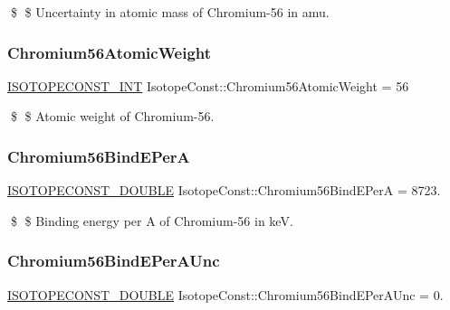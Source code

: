 \$ \$ Uncertainty in atomic mass of Chromium-\/56 in amu. \mbox{\label{group___isotope_const-_chromium-_cr56_gaf7f0bd3cfef314ac0103cbfc12ed80d1}} 
\subsubsection{\texorpdfstring{Chromium56\+Atomic\+Weight}{Chromium56AtomicWeight}}
{\footnotesize\ttfamily \mbox{\hyperlink{group___isotope_const-_macros_ga5f18360b3e99483a35c32d789e62621c}{I\+S\+O\+T\+O\+P\+E\+C\+O\+N\+S\+T\+\_\+\+I\+NT}} Isotope\+Const\+::\+Chromium56\+Atomic\+Weight = 56}

\$ \$ Atomic weight of Chromium-\/56. \mbox{\label{group___isotope_const-_chromium-_cr56_ga823b1743aedc1e5ce038b2ea56a2c86e}} 
\subsubsection{\texorpdfstring{Chromium56\+Bind\+E\+PerA}{Chromium56BindEPerA}}
{\footnotesize\ttfamily \mbox{\hyperlink{group___isotope_const-_macros_ga8f45a7272ce02c0b4c65c44636ed719a}{I\+S\+O\+T\+O\+P\+E\+C\+O\+N\+S\+T\+\_\+\+D\+O\+U\+B\+LE}} Isotope\+Const\+::\+Chromium56\+Bind\+E\+PerA = 8723.}

\$ \$ Binding energy per A of Chromium-\/56 in keV. \mbox{\label{group___isotope_const-_chromium-_cr56_ga369915b1804e509305def4928bbb89be}} 
\subsubsection{\texorpdfstring{Chromium56\+Bind\+E\+Per\+A\+Unc}{Chromium56BindEPerAUnc}}
{\footnotesize\ttfamily \mbox{\hyperlink{group___isotope_const-_macros_ga8f45a7272ce02c0b4c65c44636ed719a}{I\+S\+O\+T\+O\+P\+E\+C\+O\+N\+S\+T\+\_\+\+D\+O\+U\+B\+LE}} Isotope\+Const\+::\+Chromium56\+Bind\+E\+Per\+A\+Unc = 0.}


